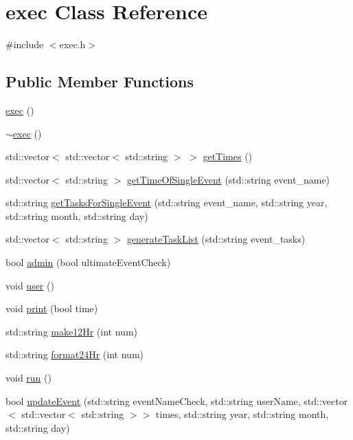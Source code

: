\hypertarget{classexec}{}\section{exec Class Reference}
\label{classexec}


{\ttfamily \#include $<$exec.\+h$>$}

\subsection*{Public Member Functions}
\begin{DoxyCompactItemize}
\item 
\hyperlink{classexec_a2fac94db8f997a01a590c01478662339}{exec} ()
\item 
\hyperlink{classexec_a663a64f17c5431dc01a829f5633e4f56}{$\sim$exec} ()
\item 
std\+::vector$<$ std\+::vector$<$ std\+::string $>$ $>$ \hyperlink{classexec_a4ca78729a8eabc233fd936948c85565e}{get\+Times} ()
\item 
std\+::vector$<$ std\+::string $>$ \hyperlink{classexec_aa81946a7084e58b434cbbb3f41d646af}{get\+Time\+Of\+Single\+Event} (std\+::string event\+\_\+name)
\item 
std\+::string \hyperlink{classexec_a82e4d3616bf5ef3790b343de9f255548}{get\+Tasks\+For\+Single\+Event} (std\+::string event\+\_\+name, std\+::string year, std\+::string month, std\+::string day)
\item 
std\+::vector$<$ std\+::string $>$ \hyperlink{classexec_a056e0f55ae4c4661f7485fe8fc221210}{generate\+Task\+List} (std\+::string event\+\_\+tasks)
\item 
bool \hyperlink{classexec_ab114315e1bb0daff8f96dc03e7c88392}{admin} (bool ultimate\+Event\+Check)
\item 
void \hyperlink{classexec_a924407f4d277807e949aa9e97470f536}{user} ()
\item 
void \hyperlink{classexec_a4cf771a565711689023aa75141f82c52}{print} (bool time)
\item 
std\+::string \hyperlink{classexec_ade14fc20cd40b2d5e3e8e5abbda382d4}{make12\+Hr} (int num)
\item 
std\+::string \hyperlink{classexec_a24a4ca6c8f63a73ed38ddc8e9d015c46}{format24\+Hr} (int num)
\item 
void \hyperlink{classexec_aad3ea9a2cd99fc28471062719b85b1f6}{run} ()
\item 
bool \hyperlink{classexec_a53711d45518e4b3b690db15f057c1452}{update\+Event} (std\+::string event\+Name\+Check, std\+::string user\+Name, std\+::vector$<$ std\+::vector$<$ std\+::string $>$$>$ times, std\+::string year, std\+::string month, std\+::string day)
$$
\end{DoxyCompactItemize}
